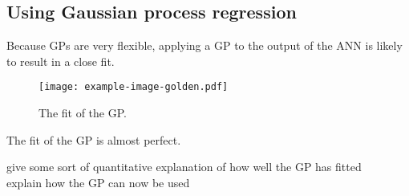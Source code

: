 \subsection{Using Gaussian process regression}

Because \acp{GP} are very flexible, applying a \ac{GP} to the output of the \ac{ANN} is likely to result in a close fit.

\begin{figure}[htbp]
	\centering
	\texttt{[image: example-image-golden.pdf]}
	\caption{The fit of the \ac{GP}.}
	\label{fig:gp-fit}
\end{figure}

The fit of the \ac{GP} is almost perfect.

\begin{todo}
	give some sort of quantitative explanation of how well the GP has fitted \\
	explain how the GP can now be used
\end{todo}

